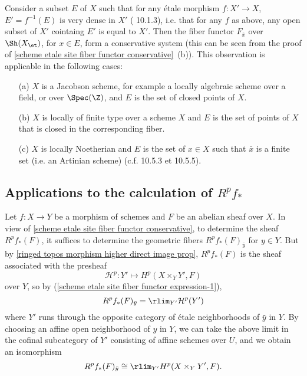 \begin{remark}
Consider a subset $E$ of $X$ such that for any \'etale morphism $f:X'\to X$, $E'=f^{-1}(E)$ is very dense in $X'$ (\cite{EGA4} 10.1.3), i.e. that for any $f$ as above, any open subset of $X'$ cointaing $E'$ is equal to $X'$. Then the fiber functor $F_{\bar{x}}$ over $\Sh(X_\et)$, for $x\in E$, form a conservative system (this can be seen from the proof of \cref{scheme etale site fiber functor conservative}~(b)). This observation is applicable in the following cases:
\begin{enumerate}
    \item[(a)] $X$ is a Jacobson scheme, for example a locally algebraic scheme over a field, or over $\Spec(\Z)$, and $E$ is the set of closed points of $X$.
    \item[(b)] $X$ is locally of finite type over a scheme $X$ and $E$ is the set of points of $X$ that is closed in the corresponding fiber.
    \item[(c)] $X$ is locally Noetherian and $E$ is the set of $x\in X$ such that $\bar{x}$ is a finite set (i.e. an Artinian scheme) (c.f. \cite{EGA4} 10.5.3 et 10.5.5).
\end{enumerate} 
\end{remark}

\subsection{Applications to the calculation of \texorpdfstring{$R^pf_*$}{Rf}}
Let $f:X\to Y$ be a morphism of schemes and $F$ be an abelian sheaf over $X$. In view of \cref{scheme etale site fiber functor conservative}, to determine the sheaf $R^pf_*(F)$, it suffices to determine the geometric fibers $R^pf_*(F)_{\bar{y}}$ for $y\in Y$. But by \cref{ringed topos morphism higher direct image prop}, $R^pf_*(F)$ is the sheaf associated with the presheaf
\[\mathcal{H}^p:Y'\mapsto H^p(X\times_YY',F)\]
over $Y$, so by (\ref{scheme etale site fiber functor expression-1}),
\[R^pf_*(F)_{\bar{y}}=\rlim_{Y'}\mathcal{H}^p(Y')\]
where $Y'$ runs through the opposite category of \'etale neighborhoods of $\bar{y}$ in $Y$. By choosing an affine open neighborhood of $y$ in $Y$, we can take the above limit in the cofinal subcategory of $Y'$ consisting of affine schemes over $U$, and we obtain an isomorphism
\begin{equation}\label{scheme etale site higher direct image fiber morphism-1}
R^pf_*(F)_{\bar{y}}\cong \rlim_{Y'} H^p(X\times_YY',F).
\end{equation}


